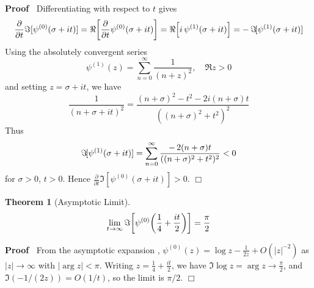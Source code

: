 \documentclass{article}
\newenvironment{proof}{\noindent\textbf{Proof\ }}{\hspace*{\fill}$\Box$\medskip}
\newtheorem{theorem}{Theorem}
\begin{document}
\begin{proof}
  Differentiating with respect to $t$ gives
  \begin{equation}
    \frac{\partial}{\partial t} \Im [\psi^{(0)} (\sigma + it)] = \Re
    \hspace{-0.17em} \left[ \frac{\partial}{\partial t} \psi^{(0)} (\sigma +
    it) \right] = \Re \hspace{-0.17em} \left[ i \hspace{0.17em} \psi^{(1)}
    (\sigma + it) \right] = - \hspace{0.17em} \Im \hspace{-0.17em} [\psi^{(1)}
    (\sigma + it)]
  \end{equation}
  Using the absolutely convergent series {\cite{DLMF5.4.2}}
  \begin{equation}
    \psi^{(1)} (z) = \sum_{n = 0}^{\infty} \frac{1}{(n + z)^2}, \quad \Re z >
    0
  \end{equation}
  and setting $z = \sigma + it$, we have
  \begin{equation}
    \frac{1}{(n + \sigma + it)^2} = \frac{(n + \sigma)^2 - t^2 - 2 i (n +
    \sigma) t}{((n + \sigma)^2 + t^2)^2}
  \end{equation}
  Thus
  \begin{equation}
    \Im \hspace{-0.17em} [\psi^{(1)} (\sigma + it)] = \sum_{n = 0}^{\infty}
    \frac{- \hspace{0.17em} 2 (n + \sigma) t}{((n + \sigma)^2 + t^2)^2} < 0
  \end{equation}
  for $\sigma > 0$, $t > 0$. Hence $\frac{\partial}{\partial t} \Im
  [\psi^{(0)} (\sigma + it)] > 0$.
\end{proof}

\begin{theorem}
  [Asymptotic Limit]\label{thm:growth}
  \begin{equation}
    \lim_{t \to \infty} \Im \hspace{-0.17em} \left[ \psi^{(0)} 
    \hspace{-0.17em} \left( \frac{1}{4} + \frac{it}{2} \right) \right] =
    \frac{\pi}{2}
  \end{equation}
\end{theorem}

\begin{proof}
  From the asymptotic expansion {\cite{DLMF5.11.1}}, $\psi^{(0)} (z) = \log z
  - \frac{1}{2 z} + O (|z|^{- 2})$ as $|z| \to \infty$ with $| \arg z| < \pi$.
  Writing $z = \frac{1}{4} + \frac{it}{2}$, we have $\Im \log z = \arg z \to
  \frac{\pi}{2}$, and $\Im (- 1 / (2 z)) = O (1 / t)$, so the limit is $\pi /
  2$.
\end{proof}
\end{document}
